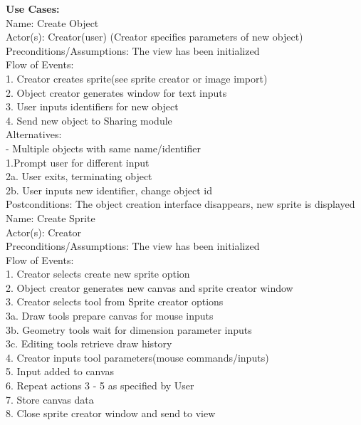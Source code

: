 \documentclass[12pt]{report}
\begin{document}
\pagebreak



{\bf\large Use Cases: \\[1\baselineskip] }
Name: Create Object\\
Actor(s): Creator(user)
(Creator specifies parameters of new object)\\
Preconditions/Assumptions: The view has been initialized\\[1\baselineskip]
Flow of Events:\\
1. Creator creates sprite(see sprite creator or image import)\\
2. Object creator generates window for text inputs\\
3. User inputs identifiers for new object\\
4. Send new object to Sharing module\\[1\baselineskip]
Alternatives:\\
- Multiple objects with same name/identifier\\
1.Prompt user for different input\\
2a. User exits, terminating object\\
2b. User inputs new identifier, change object id\\
Postconditions: The object creation interface disappears, new sprite is displayed\\[2\baselineskip]
Name: Create Sprite\\
Actor(s): Creator\\
Preconditions/Assumptions: The view has been initialized\\

Flow of Events:\\
1. Creator selects create new sprite option\\
2. Object creator generates new canvas and sprite creator window\\
3. Creator selects tool from Sprite creator options\\
3a. Draw tools prepare canvas for mouse inputs\\
3b. Geometry tools wait for dimension parameter inputs\\
3c. Editing tools retrieve draw history\\
4. Creator inputs tool parameters(mouse commands/inputs)\\
5. Input added to canvas\\
6. Repeat actions 3 - 5 as specified by User\\
7. Store canvas data\\
8. Close sprite creator window and send to view\\
\end{document}

